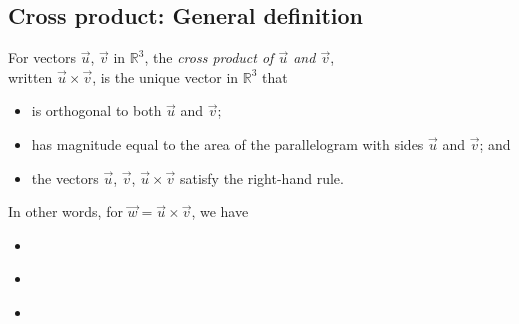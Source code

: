 \subsection{Cross product: General definition}
\begin{framed}
    \begin{defn}
        For vectors $\vec{u}$, $\vec{v}$ in $\mathbb{R}^3$, the \emph{cross product of $\vec{u}$ and $\vec{v}$}, \\ written $\vec{u}\times\vec{v}$, is the unique vector in $\mathbb{R}^3$ that
        \begin{itemize}
            \item is orthogonal to both $\vec{u}$ and $\vec{v}$;
            \item has magnitude equal to the area of the parallelogram with sides $\vec{u}$ and $\vec{v}$; and
            \item the vectors $\vec{u}$, $\vec{v}$, $\vec{u}\times\vec{v}$ satisfy the right-hand rule.%
        \end{itemize}
        In other words, for $\vec{w}=\vec{u}\times\vec{v}$, we have \\ \begin{minipage}{.6\textwidth}
            \begin{itemize}
                \item {}\\
                \item {}\\
                \item {}\\ 
            \end{itemize}
        \end{minipage}
        \hfill
        \begin{minipage}{.3\textwidth} 

\end{minipage}
\end{defn}
\end{framed}
